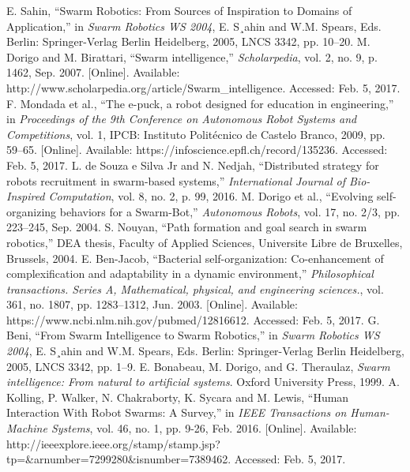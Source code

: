 \documentclass[titlepage,hidelinks,10pt]{article}
\begin{document}
\newpage
\begin{thebibliography}{1}
 E. Sahin, ``Swarm Robotics: From Sources of Inspiration to Domains of Application,'' in \textit{Swarm Robotics WS 2004}, E. S¸ahin and W.M. Spears, Eds. Berlin: Springer-Verlag Berlin Heidelberg, 2005, LNCS 3342, pp. 10–20.
 M. Dorigo and M. Birattari, ``Swarm intelligence,'' \textit{Scholarpedia}, vol. 2, no. 9, p. 1462, Sep. 2007. [Online]. Available: http://www.scholarpedia.org/article/Swarm\_intelligence. Accessed: Feb. 5, 2017.
 F. Mondada et al., ``The e-puck, a robot designed for education in engineering,'' in \textit{Proceedings of the 9th Conference on Autonomous Robot Systems and Competitions}, vol. 1, IPCB: Instituto Politécnico de Castelo Branco, 2009, pp. 59–65. [Online]. Available: https://infoscience.epfl.ch/record/135236. Accessed: Feb. 5, 2017.
 L. de Souza e Silva Jr and N. Nedjah, ``Distributed strategy for robots recruitment in swarm-based systems,'' \textit{International Journal of Bio-Inspired Computation}, vol. 8, no. 2, p. 99, 2016.
 M. Dorigo et al., ``Evolving self-organizing behaviors for a Swarm-Bot,'' \textit{Autonomous Robots}, vol. 17, no. 2/3, pp. 223–245, Sep. 2004.
 S. Nouyan, ``Path formation and goal search in swarm robotics,'' DEA thesis, Faculty of Applied Sciences, Universite Libre de Bruxelles, Brussels, 2004.
 E. Ben-Jacob, ``Bacterial self-organization: Co-enhancement of complexification and adaptability in a dynamic environment,'' \textit{Philosophical transactions. Series A, Mathematical, physical, and engineering sciences.}, vol. 361, no. 1807, pp. 1283–1312, Jun. 2003. [Online]. Available: https://www.ncbi.nlm.nih.gov/pubmed/12816612. Accessed: Feb. 5, 2017.
G. Beni, ``From Swarm Intelligence to Swarm Robotics,'' in \textit{Swarm Robotics WS 2004}, E. S¸ahin and W.M. Spears, Eds. Berlin: Springer-Verlag Berlin Heidelberg, 2005, LNCS 3342, pp. 1–9.
 E. Bonabeau, M. Dorigo, and G. Theraulaz, \textit{Swarm intelligence: From natural to artificial systems}. Oxford University Press, 1999.
 A. Kolling, P. Walker, N. Chakraborty, K. Sycara and M. Lewis, ``Human Interaction With Robot Swarms: A Survey,'' in \textit{IEEE Transactions on Human-Machine Systems}, vol. 46, no. 1, pp. 9-26, Feb. 2016. [Online]. Available: http://ieeexplore.ieee.org/stamp/stamp.jsp?tp=\&arnumber=7299280\&isnumber=7389462. Accessed: Feb. 5, 2017.

\end{thebibliography}
\end{document}
